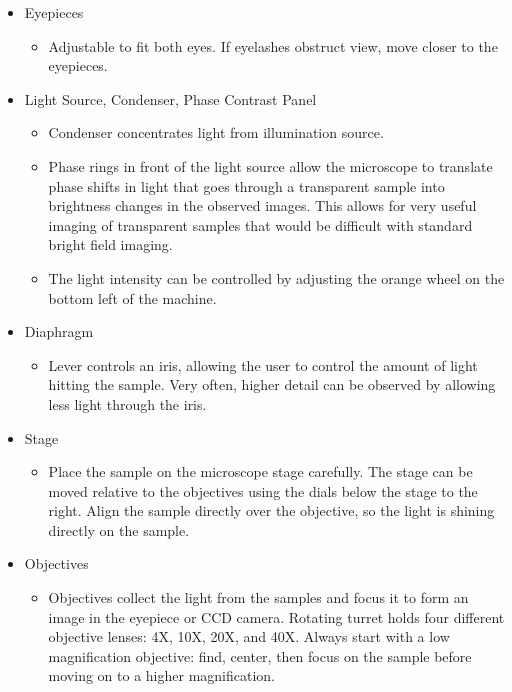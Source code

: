 \begin{itemize}
\setlength\itemsep{1pt}
\item Eyepieces
\begin{itemize}
	\setlength\itemsep{1pt}
	\item Adjustable to fit both eyes. If eyelashes obstruct view, move closer to the eyepieces.
\end{itemize}
\item Light Source, Condenser, Phase Contrast Panel
\begin{itemize}
	\setlength\itemsep{1pt}
	\item Condenser concentrates light from illumination source.
	\item Phase rings in front of the light source allow the microscope to translate phase shifts in light that goes through a transparent sample into brightness changes in the observed images. This allows for very useful imaging of transparent samples that would be difficult with standard bright field imaging.
	\item The light intensity can be controlled by adjusting the orange wheel on the bottom left of the machine.
\end{itemize}
\item Diaphragm
\begin{itemize}
	\setlength\itemsep{1pt}
	\item Lever controls an iris, allowing the user to control the amount of light hitting the sample. Very often, higher detail can be observed by allowing less light through the iris.
\end{itemize}
\item Stage
\begin{itemize}
	\setlength\itemsep{1pt}
	\item Place the sample on the microscope stage carefully. The stage can be moved relative to the objectives using the dials below the stage to the right. Align the sample directly over the objective, so the light is shining directly on the sample.
\end{itemize}
\item Objectives
\begin{itemize}
	\setlength\itemsep{1pt}
	\item Objectives collect the light from the samples and focus it to form an image in the eyepiece or CCD camera. Rotating turret holds four different objective lenses: 4X, 10X, 20X, and 40X. Always start with a low magnification objective: find, center, then focus on the sample before moving on to a higher magnification.

\end{itemize}
\end{itemize}
